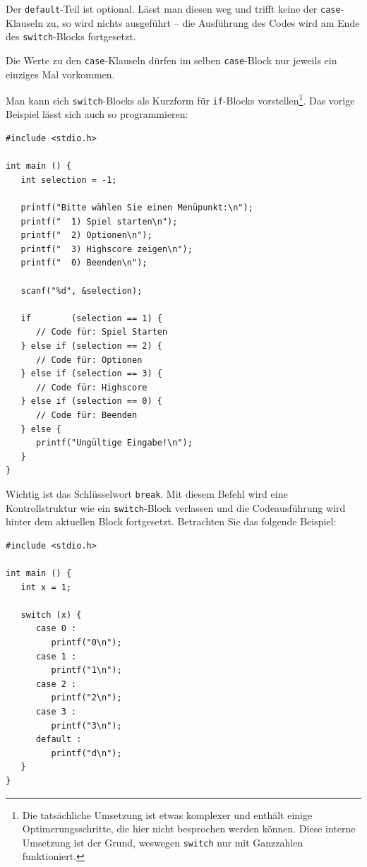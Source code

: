 Der \texttt{default}-Teil ist optional. Lässt man diesen weg und trifft keine der \texttt{case}-Klauseln zu, so wird nichts ausgeführt -- die Ausführung des Codes wird am Ende des \texttt{switch}-Blocks fortgesetzt.

Die Werte zu den \texttt{case}-Klauseln dürfen im selben \texttt{case}-Block nur jeweils ein einziges Mal vorkommen.

Man kann sich \texttt{switch}-Blocks als Kurzform für \texttt{if}-Blocks vorstellen\footnote{Die tatsächliche Umsetzung ist etwas komplexer und enthält einige Optimerungsschritte, die hier nicht besprochen werden können. Diese interne Umsetzung ist der Grund, weswegen \texttt{switch} nur mit Ganzzahlen funktioniert.}. Das vorige Beispiel lässt sich auch so programmieren:

\begin{codebox}
\begin{verbatim}
#include <stdio.h>

int main () {
   int selection = -1;

   printf("Bitte wählen Sie einen Menüpunkt:\n");
   printf("  1) Spiel starten\n");
   printf("  2) Optionen\n");
   printf("  3) Highscore zeigen\n");
   printf("  0) Beenden\n");

   scanf("%d", &selection);

   if        (selection == 1) {
      // Code für: Spiel Starten
   } else if (selection == 2) {
      // Code für: Optionen
   } else if (selection == 3) {
      // Code für: Highscore
   } else if (selection == 0) {
      // Code für: Beenden
   } else {
      printf("Ungültige Eingabe!\n");
   }
}
\end{verbatim}
\end{codebox}

Wichtig ist das Schlüsselwort \texttt{break}. Mit diesem Befehl wird eine Kontrollstruktur wie ein \texttt{switch}-Block verlassen und die Codeausführung wird hinter dem aktuellen Block fortgesetzt. Betrachten Sie das folgende Beispiel:

\begin{warnbox}[Beispiel: \texttt{switch} ohne \texttt{break}, leftupper=7mm]
\begin{verbatim}
#include <stdio.h>

int main () {
   int x = 1;

   switch (x) {
      case 0 :
         printf("0\n");
      case 1 :
         printf("1\n");
      case 2 :
         printf("2\n");
      case 3 :
         printf("3\n");
      default :
         printf("d\n");
   }
}
\end{verbatim}
\end{warnbox}


